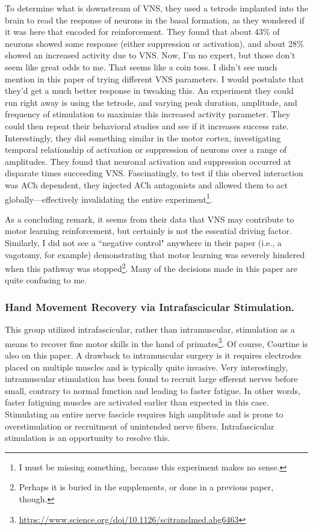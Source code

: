 \documentclass[12pt]{report}
\begin{document}
To determine what is downstream of VNS, they used a tetrode implanted into the brain to read the response of neurons in the basal formation, as they wondered if it was here that encoded for reinforcement. They found that about 43\% of neurons showed some response (either suppression or activation), and about 28\% showed an increased activity due to VNS. Now, I'm no expert, but those don't seem like great odds to me. That seems like a coin toss. I didn't see much mention in this paper of trying different VNS parameters. I would postulate that they'd get a much better response in tweaking this. An experiment they could run right away is using the tetrode, and varying peak duration, amplitude, and frequency of stimulation to maximize this increased activity parameter. They could then repeat their behavioral studies and see if it increases success rate. Interestingly, they did something similar in the motor cortex, investigating temporal relationship of activation or suppression of neurons over a range of amplitudes. They found that neuronal activation and suppression occurred at disparate times succeeding VNS. Fascinatingly, to test if this oberved interaction was ACh dependent, they injected ACh antagonists and allowed them to act globally---effectively invalidating the entire experiment\footnote{I must be missing something, because this experiment makes no sense.}.\newline

As a concluding remark, it seems from their data that VNS may contribute to motor learning reinforcement, but certainly is not the essential driving factor. Similarly, I did not see a ``negative control" anywhere in their paper (i.e., a vagotomy, for example) demonstrating that motor learning was severely hindered when this pathway was stopped\footnote{Perhaps it is buried in the supplements, or done in a previous paper, though.}. Many of the decisions made in this paper are quite confusing to me. 

\subsubsection{Hand Movement Recovery via Intrafascicular Stimulation.}

This group utilized intrafascicular, rather than intramuscular, stimulation as a means to recover fine motor skills in the hand of primates\footnote{\url{https://www.science.org/doi/10.1126/scitranslmed.abg6463}}. Of course, Courtine is also on this paper. A drawback to intramuscular surgery is it requires electrodes placed on multiple muscles and is typically quite invasive. Very interestingly, intramuscular stimulation has been found to recruit large efferent nerves before small, contrary to normal function and leading to faster fatigue. In other words, faster fatiguing muscles are activated earlier than expected in this case. Stimulating an entire nerve fascicle requires high amplitude and is prone to overstimulation or recruitment of unintended nerve fibers. Intrafascicular stimulation is an opportunity to resolve this.\newline
\end{document}
